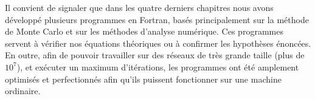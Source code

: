 Il convient de signaler que dans les quatre derniers chapitres nous avons développé plusieurs programmes en Fortran, basés principalement sur la méthode de Monte Carlo et sur les méthodes d'analyse numérique. Ces programmes servent à vérifier nos équations théoriques ou à confirmer les hypothèses énoncées. En outre, afin de pouvoir travailler sur des réseaux de très grande taille (plus de $10^7$), et exécuter un maximum d'itérations, les programmes ont été amplement optimisés et perfectionnés afin qu'ils puissent fonctionner sur une machine ordinaire. 




 
